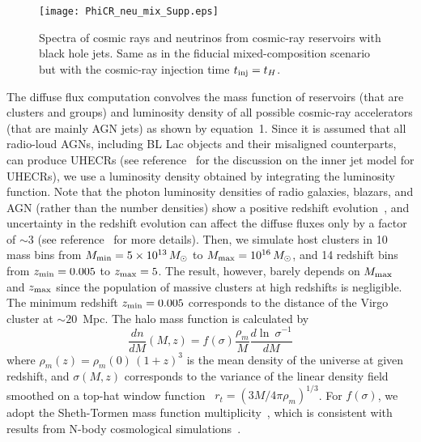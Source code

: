 \documentclass[aps,prd,onecolumn,superscriptaddress,11pt]{revtex4}
\begin{document}
\begin{figure*}[tb]
\texttt{[image: PhiCR\_neu\_mix\_Supp.eps]}
\caption{\small \label{fig:t_H} Spectra of cosmic rays and neutrinos from cosmic-ray reservoirs with black hole jets. Same as in the fiducial mixed-composition scenario but with the cosmic-ray injection time $t_{\rm inj}=t_H$. 
}
\end{figure*} 

The diffuse flux computation convolves the mass function of reservoirs (that are clusters and groups) and luminosity density of all possible cosmic-ray accelerators (that are mainly AGN jets) as shown by equation~1. Since it is assumed that all radio-loud AGNs, including BL Lac objects and their misaligned counterparts, can produce UHECRs (see reference~\cite{Murase:2012rd} for the discussion on the inner jet model for UHECRs), we use a luminosity density obtained by integrating the luminosity function. Note that the photon luminosity densities of radio galaxies, blazars, and AGN (rather than the number densities) show a positive redshift evolution~\cite{Willott:2000dh,Ajello:2013lka,Ueda:2014tma}, and uncertainty in the redshift evolution can affect the diffuse fluxes only by a factor of $\sim3$ (see reference~\cite{2016PhRvD..94j3006M} for more details).
Then, we simulate host clusters in 10 mass bins from $M_{\rm min}=5\times10^{13}\,M_\odot$ to $M_{\rm max} = 10^{16}\,M_\odot$, and 14 redshift bins from $z_{\rm min} =0.005$ to $z_{\rm max} =5$. The result, however, barely depends on $M_{\rm max}$ and $z_{\rm max}$ since the population of massive clusters at high redshifts is negligible. The minimum redshift $z_{\rm min} = 0.005$ corresponds to the distance of the Virgo cluster at $\sim 20$~Mpc. The halo mass function is calculated by 
\begin{equation}
\label{eq:dndM}
\frac{dn}{dM} (M, z)= f(\sigma) \frac{\rho_m}{M}\frac{d \ln~\sigma^{-1}}{dM}
\end{equation} 
where $\rho_m(z) =\rho_m(0)\,(1+z)^3$ is the mean density of the universe at given redshift, and $\sigma(M, z)$ corresponds to the variance of the linear density field smoothed on a top-hat window function~\cite{2008ApJ...688..709T} $r_t=(3M/4\pi\rho_m)^{1/3}$. For $f(\sigma)$, we adopt the Sheth-Tormen mass function multiplicity~\cite{sheth_tormen_mass_function}, which is consistent with results from N-body cosmological simulations~\cite{Jenkins01,Warren:2005ey,2008ApJ...688..709T}. 
\end{document}
